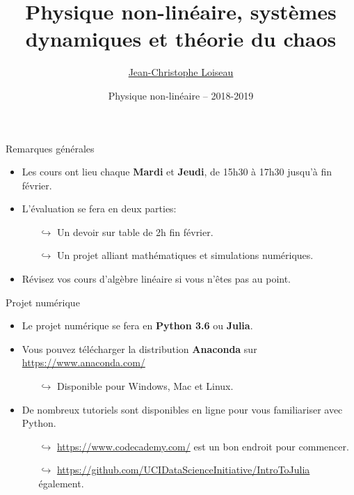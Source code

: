 \documentclass[usenames,dvipsnames,svgnames,10pt,aspectratio=169]{beamer}
\title[Nonlinear physics] %
{
	Physique non-lin\'eaire, syst\`emes \\ dynamiques et th\'eorie du chaos
}
\author[J.-Ch.~Loiseau] %
{
	\underline{Jean-Christophe Loiseau}
}
\institute[unused]
{
	\url{jean-christophe.loiseau@ensam.eu} \\
	Laboratoire DynFluid \\
	Arts et M\'etiers ParisTech, France.
}
\date[unused]{Physique non-lin\'eaire -- 2018-2019}
\begin{document}
\titleframe %


\begin{frame}[t, c]{Remarques générales}{}
	\begin{itemize}
		\item Les cours ont lieu chaque \textbf{\alert{Mardi}} et \textbf{\alert{Jeudi}}, de 15h30 à 17h30 jusqu'à fin février.

		\bigskip

		\item L'évaluation se fera en deux parties:
		\begin{itemize}
			\item[$\hookrightarrow$] Un devoir sur table de 2h fin février.
			\item[$\hookrightarrow$] Un projet alliant mathématiques et simulations numériques.
		\end{itemize}

		\bigskip

		\item Révisez vos cours d'algèbre linéaire si vous n'êtes pas au point.

	\end{itemize}
\end{frame}

\begin{frame}[t, c]{Projet numérique}{}

	\begin{itemize}
		\item Le projet numérique se fera en \alert{\textbf{Python 3.6}} ou \alert{\textbf{Julia}}.

		\bigskip

		\item Vous pouvez télécharger la distribution \alert{\textbf{Anaconda}} sur \url{https://www.anaconda.com/}
		\begin{itemize}
			\item[$\hookrightarrow$] Disponible pour Windows, Mac et Linux.
		\end{itemize}

		\bigskip

		\item De nombreux tutoriels sont disponibles en ligne pour vous familiariser avec Python.
		\begin{itemize}
			\item[$\hookrightarrow$] \url{https://www.codecademy.com/} est un bon endroit pour commencer.
			\item[$\hookrightarrow$] \url{https://github.com/UCIDataScienceInitiative/IntroToJulia} également.
		\end{itemize}

	\end{itemize}

	\vspace{1cm}
\end{frame}
\end{document}
